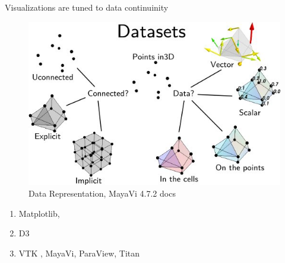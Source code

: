 \documentclass[xcolor={dvipsnames}, handout]{beamer}
\begin{document}
\begin{frame}{Visualizations are tuned to data continuinity\cite{toryRethinkingVisualizationHighlevel2004}}
    \begin{figure}
        \includegraphics[height=.5\textheight]{figures/intro/dataset_diagram.png}
        \caption{Data Representation, MayaVi 4.7.2 docs\cite{DataRepresentationMayavi}}
    \end{figure}
    \begin{enumerate}
        \item Matplotlib\cite{hunterMatplotlib2DGraphics2007}, 
        \item D3 \cite{bostockDataDrivenDocuments2011}
        \item VTK \cite{hanwellVisualizationToolkitVTK2015,geveci2012vtk}, MayaVi\cite{RamachandranMayaVI2011}, ParaView\cite{ahrens2005paraview}, Titan\cite{brianwylieUnifiedToolkitInformation2009}
    \end{enumerate}
\end{frame}
\end{document}
